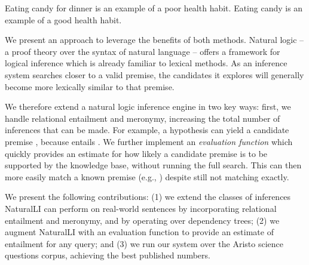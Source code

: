 \entailmentExample
{Eating candy for dinner is an example of a poor health habit.}
{Eating candy is an example of a good health habit.}

We present an approach to leverage the benefits of both methods.
Natural logic -- a proof theory over the syntax of natural language --
  offers a framework for logical inference which is already
  familiar to lexical methods.
As an inference system searches closer to a valid premise,
  the candidates it explores will generally become more lexically similar
  to that premise.

We therefore extend a natural logic inference engine in two key ways:
  first, we handle relational entailment 
  and meronymy, increasing the total number of inferences that can be made.
  For example, a hypothesis  can yield
  a candidate premise , because 
  entails .
We further implement an \textit{evaluation function} which quickly
  provides an estimate for how likely a candidate premise is to be supported
  by the knowledge base, without running the full search.
This can then more easily match a known premise 
  (e.g., ) 
  despite still not matching exactly.

We present the following contributions:
(1) we extend the classes of inferences NaturalLI can perform on real-world 
    sentences by
    incorporating relational entailment and meronymy, and by operating over 
    dependency trees;
(2) we augment NaturalLI with an evaluation function to provide an estimate of entailment
    for any query; and 
(3) we run our system over the Aristo science questions corpus,
    achieving the best published numbers.


